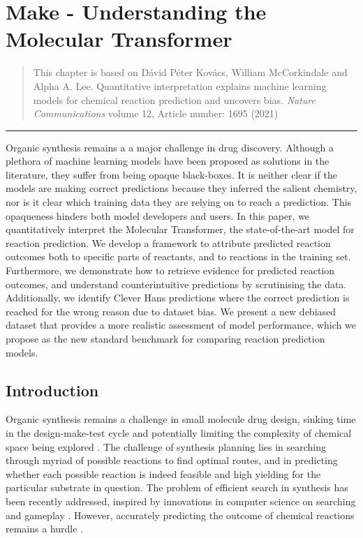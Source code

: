 
\chapter{Make - Understanding the Molecular Transformer}\label{ch:transformer}

\begin{quote}
    This chapter is based on Dávid Péter Kovács, William McCorkindale and Alpha A. Lee. Quantitative interpretation explains machine learning models for chemical reaction prediction and uncovers bias. \textit{Nature Communications} volume 12, Article number: 1695 (2021)
\end{quote}

\noindent\hfil\rule{0.5\textwidth}{.4pt}\hfil

Organic synthesis remains a a major challenge in drug discovery. Although a plethora of machine learning models have been proposed as solutions in the literature, they suffer from being opaque black-boxes. It is neither clear if the models are making correct predictions because they inferred the salient chemistry, nor is it clear which training data they are relying on to reach a prediction. This opaqueness hinders both model developers and users. In this paper, we quantitatively interpret the Molecular Transformer, the state-of-the-art model for reaction prediction. We develop a framework to attribute predicted reaction outcomes both to specific parts of reactants, and to reactions in the training set. Furthermore, we demonstrate how to retrieve evidence for predicted reaction outcomes, and understand counterintuitive predictions by scrutinising the data. Additionally, we identify Clever Hans predictions where the correct prediction is reached for the wrong reason due to dataset bias. We present a new debiased dataset that provides a more realistic assessment of model performance, which we propose as the new standard benchmark for comparing reaction prediction models.

\section*{\label{sec:intro}Introduction}

Organic synthesis remains a challenge in small molecule drug design, sinking time in the design-make-test cycle and potentially limiting the complexity of chemical space being explored \cite{blakemore2018organic,bostrom2018expanding}. The challenge of synthesis planning lies in searching through myriad of possible reactions to find optimal routes, and in predicting whether each possible reaction is indeed feasible and high yielding for the particular substrate in question. The problem of efficient search in synthesis has been recently addressed, inspired by innovations in computer science on searching and gameplay \cite{segler2017neural,segler2018planning,kishimoto2019depth,schreck2019learning, segler2019world}. However, accurately predicting the outcome of chemical reactions remains a hurdle \cite{Coley2018, Johansson2020, Struble2020}.

